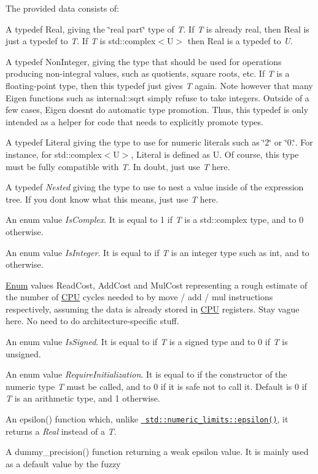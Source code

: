 The provided data consists of\+: \begin{DoxyItemize}
\item A typedef {\ttfamily Real}, giving the \char`\"{}real part\char`\"{} type of {\itshape T}. If {\itshape T} is already real, then {\ttfamily Real} is just a typedef to {\itshape T}. If {\itshape T} is {\ttfamily std\+::complex$<$\+U$>$} then {\ttfamily Real} is a typedef to {\itshape U}. \item A typedef {\ttfamily Non\+Integer}, giving the type that should be used for operations producing non-\/integral values, such as quotients, square roots, etc. If {\itshape T} is a floating-\/point type, then this typedef just gives {\itshape T} again. Note however that many Eigen functions such as internal\+::sqrt simply refuse to take integers. Outside of a few cases, Eigen doesn\textquotesingle{}t do automatic type promotion. Thus, this typedef is only intended as a helper for code that needs to explicitly promote types. \item A typedef {\ttfamily Literal} giving the type to use for numeric literals such as \char`\"{}2\char`\"{} or \char`\"{}0.\char`\"{}. For instance, for {\ttfamily std\+::complex$<$\+U$>$}, Literal is defined as {\ttfamily U}. Of course, this type must be fully compatible with {\itshape T}. In doubt, just use {\itshape T} here. \item A typedef {\itshape Nested} giving the type to use to nest a value inside of the expression tree. If you don\textquotesingle{}t know what this means, just use {\itshape T} here. \item An enum value {\itshape Is\+Complex}. It is equal to 1 if {\itshape T} is a {\ttfamily std\+::complex} type, and to 0 otherwise. \item An enum value {\itshape Is\+Integer}. It is equal to {} if {\itshape T} is an integer type such as {\ttfamily int}, and to {} otherwise. \item \mbox{\hyperlink{struct_enum}{Enum}} values Read\+Cost, Add\+Cost and Mul\+Cost representing a rough estimate of the number of \mbox{\hyperlink{class_c_p_u}{C\+PU}} cycles needed to by move / add / mul instructions respectively, assuming the data is already stored in \mbox{\hyperlink{class_c_p_u}{C\+PU}} registers. Stay vague here. No need to do architecture-\/specific stuff. \item An enum value {\itshape Is\+Signed}. It is equal to {} if {\itshape T} is a signed type and to 0 if {\itshape T} is unsigned. \item An enum value {\itshape Require\+Initialization}. It is equal to {} if the constructor of the numeric type {\itshape T} must be called, and to 0 if it is safe not to call it. Default is 0 if {\itshape T} is an arithmetic type, and 1 otherwise. \item An epsilon() function which, unlike \href{http://en.cppreference.com/w/cpp/types/numeric_limits/epsilon}{\texttt{ std\+::numeric\+\_\+limits\+::epsilon()}}, it returns a {\itshape Real} instead of a {\itshape T}. \item A dummy\+\_\+precision() function returning a weak epsilon value. It is mainly used as a default value by the fuzzy 
\end{DoxyItemize}
